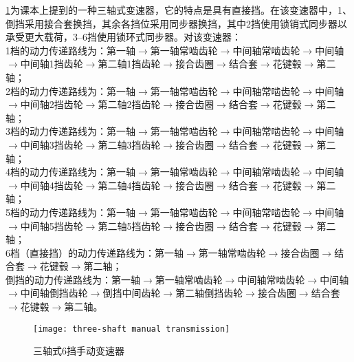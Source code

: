 \documentclass[UTF8]{ctexart}
\numberwithin{figure}{section}
\numberwithin{table}{section}
\begin{document}
\cref{three-shaft manual transmission}为课本上提到的一种三轴式变速器，它的特点是具有直接挡。在该变速器中，1、倒挡采用接合套换挡，其余各挡位采用同步器换挡，其中2挡使用锁销式同步器以承受更大载荷，\numrange[range-phrase = $\,\sim\,$]{3}{6}挡使用锁环式同步器。对该变速器：\\
1档的动力传递路线为：第一轴$\rightarrow$第一轴常啮齿轮$\rightarrow$中间轴常啮齿轮$\rightarrow$中间轴$\rightarrow$中间轴1挡齿轮$\rightarrow$第二轴1挡齿轮$\rightarrow$接合齿圈$\rightarrow$结合套$\rightarrow$花键毂$\rightarrow$第二轴；\\
2档的动力传递路线为：第一轴$\rightarrow$第一轴常啮齿轮$\rightarrow$中间轴常啮齿轮$\rightarrow$中间轴$\rightarrow$中间轴2挡齿轮$\rightarrow$第二轴2挡齿轮$\rightarrow$接合齿圈$\rightarrow$结合套$\rightarrow$花键毂$\rightarrow$第二轴；\\
3档的动力传递路线为：第一轴$\rightarrow$第一轴常啮齿轮$\rightarrow$中间轴常啮齿轮$\rightarrow$中间轴$\rightarrow$中间轴3挡齿轮$\rightarrow$第二轴3挡齿轮$\rightarrow$接合齿圈$\rightarrow$结合套$\rightarrow$花键毂$\rightarrow$第二轴；\\
4档的动力传递路线为：第一轴$\rightarrow$第一轴常啮齿轮$\rightarrow$中间轴常啮齿轮$\rightarrow$中间轴$\rightarrow$中间轴4挡齿轮$\rightarrow$第二轴4挡齿轮$\rightarrow$接合齿圈$\rightarrow$结合套$\rightarrow$花键毂$\rightarrow$第二轴；\\
5档的动力传递路线为：第一轴$\rightarrow$第一轴常啮齿轮$\rightarrow$中间轴常啮齿轮$\rightarrow$中间轴$\rightarrow$中间轴5挡齿轮$\rightarrow$第二轴5挡齿轮$\rightarrow$接合齿圈$\rightarrow$结合套$\rightarrow$花键毂$\rightarrow$第二轴；\\
6档（直接挡）的动力传递路线为：第一轴$\rightarrow$第一轴常啮齿轮$\rightarrow$接合齿圈$\rightarrow$结合套$\rightarrow$花键毂$\rightarrow$第二轴；\\
倒挡的动力传递路线为：第一轴$\rightarrow$第一轴常啮齿轮$\rightarrow$中间轴常啮齿轮$\rightarrow$中间轴$\rightarrow$中间轴倒挡齿轮$\rightarrow$倒挡中间齿轮$\rightarrow$第二轴倒挡齿轮$\rightarrow$接合齿圈$\rightarrow$结合套$\rightarrow$花键毂$\rightarrow$第二轴。

\begin{figure}[htbp]
	\centering
	\begin{minipage}[b]{\textwidth}
		\centering
		\texttt{[image: three-shaft manual transmission]}
		\caption{三轴式6挡手动变速器}
		\label{three-shaft manual transmission}
	\end{minipage}
\end{figure}
\end{document}
